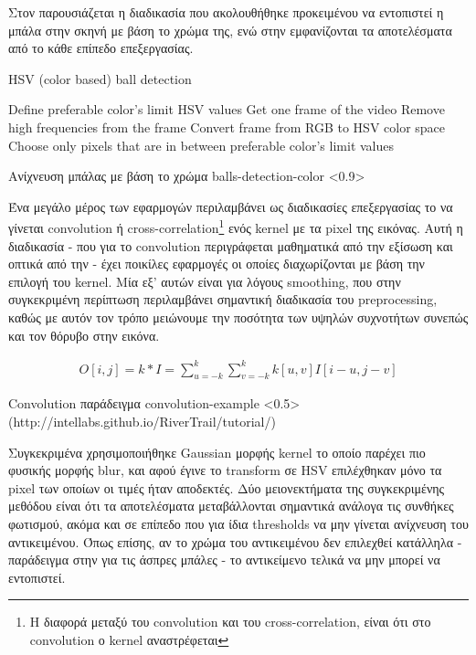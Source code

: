 Στον  παρουσιάζεται η διαδικασία που ακολουθήθηκε προκειμένου να ε\-ντο\-πι\-στεί η μπάλα στην σκηνή με βάση το χρώμα της, ενώ στην  εμφανίζονται τα αποτελέσματα από το κάθε επίπεδο επεξεργασίας.

\begin{algorithm}[H]
	\caption[HSV (color based) ball detection]{HSV (color based) ball detection}\label{alg:hsv-detect}
	\begin{algorithmic}[1]
            \State Define preferable color's limit HSV values
            \State Get one frame of the video
            \State Remove high frequencies from the frame
            \State Convert frame from RGB to HSV color space
            \State Choose only pixels that are in between preferable color's limit values 
	\end{algorithmic}
\end{algorithm}

%
{Ανίχνευση μπάλας με βάση το χρώμα}%
{balls-detection-color}%
<0.9>

Ένα μεγάλο μέρος των  εφαρμογών περιλαμβάνει ως διαδικασίες επεξεργασίας το να γίνεται convolution ή cross-correlation\footnote{Η διαφορά μεταξύ του convolution και του cross-correlation, είναι ότι στο convolution ο kernel αναστρέφεται} ενός kernel με τα pixel της εικόνας. Αυτή η διαδικασία - που για το convolution περιγράφεται μαθηματικά από την εξίσωση  και οπτικά από την  - έχει ποικίλες εφαρμογές οι οποίες διαχωρίζονται με βάση την επιλογή του kernel. Μία εξ' αυτών είναι για λόγους smoothing, που στην συγκεκριμένη περίπτωση περιλαμβάνει σημαντική διαδικασία του preprocessing, καθώς με αυτόν τον τρόπο μειώνουμε την ποσότητα των υψηλών συχνοτήτων συνεπώς και τον θόρυβο στην εικόνα.

\begin{gather}
	O[i,j] = k * I = \sum_{u=-k}^{k} \sum_{v=-k}^{k} k[u,v]I[i-u,j-v] \label{eq:cross-correlation}
\end{gather}

%
{Convolution παράδειγμα}%
{convolution-example}%
<0.5>%
(http://intellabs.github.io/RiverTrail/tutorial/)

Συγκεκριμένα χρησιμοποιήθηκε Gaussian μορφής kernel το οποίο παρέχει πιο φυσικής μορφής blur, και αφού έγινε το transform σε HSV επιλέχθηκαν μόνο τα pixel των οποίων οι τιμές ήταν αποδεκτές. Δύο μειονεκτήματα της συγκεκριμένης μεθόδου είναι ότι τα αποτελέσματα μεταβάλλονται σημαντικά ανάλογα τις συνθήκες φωτισμού, ακόμα και σε επίπεδο που για ίδια thresholds να μην γίνεται ανίχνευση του αντικειμένου. Όπως επίσης, αν το χρώμα του αντικειμένου δεν επιλεχθεί κατάλληλα - παράδειγμα στην  για τις άσπρες μπάλες - το αντικείμενο τελικά να μην μπορεί να εντοπιστεί. 

